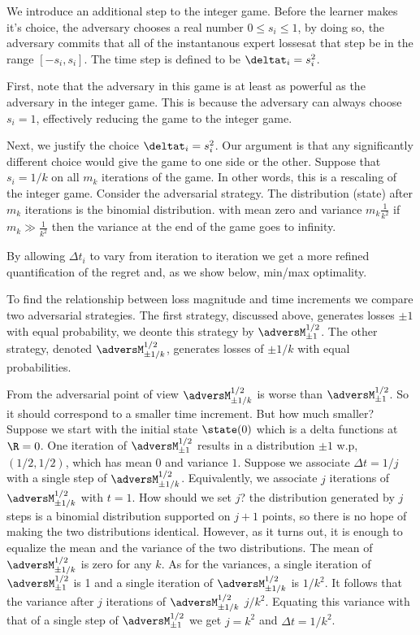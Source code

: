 We introduce an additional step to the integer game. Before the
learner makes it's choice, the 
adversary chooses a real number $0 \leq s_i \leq 1$, by doing so, the
adversary commits that all of the instantanous expert lossesat that
step be in the range $[-s_i,s_i]$. The time step is defined to be $\deltat_i =
s_i^2$.

First, note that the adversary in this game is at least as powerful as
the adversary in the integer game. This is because the adversary can
always choose $s_i=1$, effectively reducing the game to the integer
game.

Next, we justify the choice $\deltat_i = s_i^2$. Our argument is that
any significantly different choice would give the game to one side or
the other.  Suppose that $s_i = 1/k$ on all $m_k$ iterations of the game. In
other words, this is a rescaling of the integer game. Consider the
adversarial strategy. The distribution (state) after $m_k$ iterations is the
binomial distribution. with mean zero and variance $m_k \frac{1}{k^2}$
if $m_k \gg \frac{1}{k^2}$ then the variance at the end of the game
goes to infinity.

By allowing $\Delta t_i$ to vary from iteration to iteration
we get a more refined quantification of the regret and, as we show
below, min/max optimality.

To find the relationship between loss magnitude and time increments 
we compare two adversarial strategies.  The first strategy, discussed above,
generates losses $\pm 1$ with equal probability, we deonte this
strategy by $\adversM^{1/2}_{\pm 1}$. The other strategy, denoted
$\adversM^{1/2}_{\pm 1/k}$, generates losses of $\pm 1/k$ with equal
probabilities.

From the adversarial point of view $\adversM^{1/2}_{\pm 1/k}$ is worse
than $\adversM^{1/2}_{\pm 1}$. So it should correspond to a smaller
time increment. But how much smaller? Suppose we start with the
initial state $\state(0)$ which is a delta functions at $\R=0$.  One
iteration of $\adversM^{1/2}_{\pm 1}$ results in a distribution
$\pm 1$ w.p, $(1/2,1/2)$, which has mean $0$ and variance $1$.
Suppose we associate $\Delta t =1/j$ with a single step of
$\adversM^{1/2}_{\pm 1/k}$.  Equivalently, we associate $j$ iterations
of $\adversM^{1/2}_{\pm 1/k}$ with $t=1$.  How should we set $j$? the
distribution generated by $j$ steps is a binomial distribution
supported on $j+1$ points, so there is no hope of making the two
distributions identical. However, as it turns out, it is enough to
equalize the mean and the variance of the two distributions. The mean
of $\adversM^{1/2}_{\pm 1/k}$ is zero for any $k$. As for the
variances, a single iteration of $\adversM^{1/2}_{\pm 1}$ is 1 and a
single iteration of $\adversM^{1/2}_{\pm 1/k}$ is $1/k^2$. It follows
that the variance after $j$ iterations of $\adversM^{1/2}_{\pm 1/k}$
$j/k^2$. Equating this variance with that of a single step of
$\adversM^{1/2}_{\pm 1}$ we get $j=k^2$ and $\Delta t= 1/k^2$.

